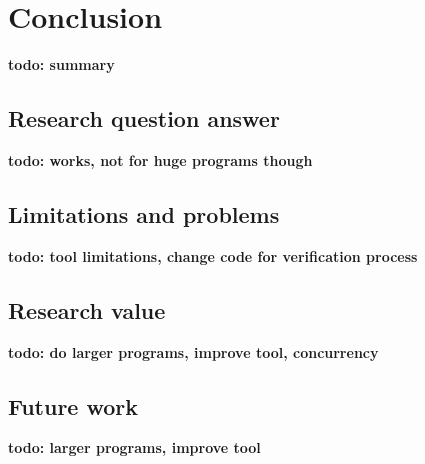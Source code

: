 \documentclass[a4paper]{article}
\newcommand{\todo}[1]{{\color{BurntOrange}\sffamily\textbf{todo: #1}\par}}
\begin{document}
\section{Conclusion}
\todo{summary}

\subsection{Research question answer}
\todo{works, not for huge programs though}

\subsection{Limitations and problems}
\todo{tool limitations, change code for verification process}

\subsection{Research value}
\todo{do larger programs, improve tool, concurrency}

\subsection{Future work}
\todo{larger programs, improve tool}




\end{document}
